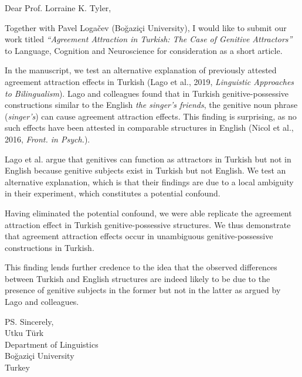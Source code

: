 \documentclass[11pt]{letter}
\date{\today}
\begin{document}
\begin{letter}{Dear Prof. Lorraine K. Tyler,}

\opening{Together with Pavel Loga\v{c}ev (Bo\u{g}azi\c{c}i University), I would like to submit our work titled \emph{``Agreement Attraction in Turkish: The Case of Genitive Attractors''} to Language, Cognition and Neuroscience for consideration as a short article. }

In the manuscript, we test an alternative explanation of previously attested agreement attraction effects in Turkish (Lago et al., 2019, \textit{Linguistic Approaches to Bilingualism}). Lago and colleagues found that in Turkish genitive-possessive constructions similar to the English \textit{the singer's friends}, the genitive noun phrase (\textit{singer's}) can cause agreement attraction effects. This finding is surprising, as no such effects have been attested in comparable structures in English (Nicol et al., 2016, \textit{Front. in Psych.}).

Lago et al. argue that genitives can function as attractors in Turkish but not in English because genitive subjects exist in Turkish but not English. We test an alternative explanation, which is that their findings are due to a local ambiguity in their experiment, which constitutes a potential confound.

Having eliminated the potential confound, we were able replicate the agreement attraction effect in Turkish genitive-possessive structures. We thus demonstrate that agreement attraction effects occur in unambiguous genitive-possessive constructions in Turkish. 

This finding lends further credence to the idea that the observed differences between Turkish and English structures are indeed likely to be due to the presence of genitive subjects in the former but not in the latter as argued by Lago and colleagues.


\ps{
Sincerely,\\
Utku T\"{u}rk\\
Department of Linguistics\\
Bo\u{g}azi\c{c}i University\\
Turkey}
\end{letter}
\end{document}
